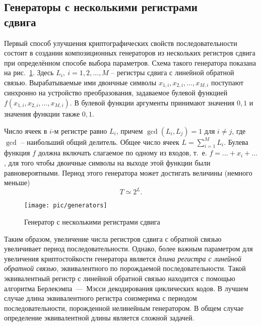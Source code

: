 \subsection[Генераторы с несколькими регистрами сдвига]{Генераторы с несколькими регистрами \protect\\ сдвига}

Первый способ улучшения криптографических свойств последовательности состоит в создании композиционных генераторов из нескольких регистров сдвига при определённом способе выбора параметров. Схема такого генератора показана на рис.~\ref{fig:generators}. Здесь $L_i, ~ i = 1, 2, \dots, M$ -- регистры сдвига с линейной обратной связью. Вырабатываемые ими двоичные символы $x_{1,i}, x_{2,i},  \dots, x_{M,i}$ поступают синхронно на устройство преобразования, задаваемое булевой функцией $f(x_{1,i}, x_{2,i}, \dots, x_{M,i})$. В булевой функции аргументы принимают значения $0,1$ и значения функции также $0,1$.

Число ячеек в $i$-м регистре равно $L_{i}$, причем $\gcd(L_i, L_j)=1$ для $i \neq j$, где $\gcd$ -- наибольший общий делитель. Общее число ячеек $L = \sum\limits_{i=1}^M L_i$. Булева функция $f$ должна включать слагаемое по одному из входов, т.~е. $f = \dots + x_i + \dots$, для того чтобы двоичные символы на выходе этой функции были равновероятными. Период этого генератора может достигать величины (немного меньше)
    \[ T \simeq 2^L. \]

\begin{figure}[!ht]
	\centering
	\texttt{[image: pic/generators]}
    \caption{Генератор с несколькими регистрами сдвига\label{fig:generators}}
\end{figure}

Таким образом, увеличение числа регистров сдвига с обратной связью увеличивает период последовательности. Однако, более важным параметром для увеличения криптостойкости генератора является \emph{ длина регистра с линейной обратной связью}, эквивалентного по порождаемой последовательности. Такой эквивалентный регистр с линейной обратной связью находится с помощью алгоритма Берлекэмпа~---~Мэсси декодирования циклических кодов. В лучшем случае длина эквивалентного регистра соизмерима с периодом последовательности, порожденной нелинейным генератором. В общем случае определение эквивалентной длины является сложной задачей.
